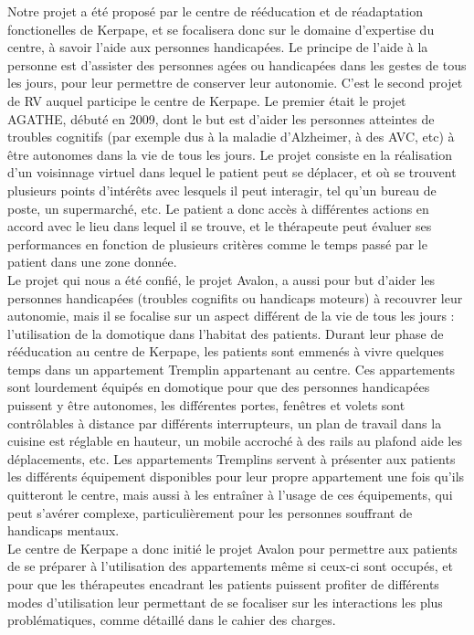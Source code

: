 Notre projet a été proposé par le centre de rééducation et de réadaptation fonctionelles de Kerpape, et se focalisera donc sur le domaine d'expertise du centre, à savoir l'aide aux personnes handicapées. Le principe de l'aide à la personne est d'assister des personnes agées ou handicapées dans les gestes de tous les jours, pour leur permettre de conserver leur autonomie. 
C'est le second projet de RV auquel participe le centre de Kerpape. Le premier était le projet AGATHE, débuté en 2009, dont le but est d'aider les personnes atteintes de troubles cognitifs (par exemple dus à la maladie d'Alzheimer, à des AVC, etc) à être autonomes dans la vie de tous les jours. Le projet consiste en la réalisation d'un \og voisinnage virtuel \fg{} dans lequel le patient peut se déplacer, et où se trouvent plusieurs points d'intérêts avec lesquels il peut interagir, tel qu'un bureau de poste, un supermarché, etc. Le patient a donc accès à différentes actions en accord avec le lieu dans lequel il se trouve, et le thérapeute peut évaluer ses performances en fonction de plusieurs critères comme le temps passé par le patient dans une zone donnée. \\

Le projet qui nous a été confié, le projet Avalon, a aussi pour but d'aider les personnes handicapées (troubles cognifits ou handicaps moteurs) à recouvrer leur autonomie, mais il se focalise sur un aspect différent de la vie de tous les jours : l'utilisation de la domotique dans l'habitat des patients. Durant leur phase de rééducation au centre de Kerpape, les patients sont emmenés à vivre quelques temps dans un appartement Tremplin appartenant au centre. Ces appartements sont lourdement équipés en domotique pour que des personnes handicapées puissent y être autonomes, les différentes portes, fenêtres et volets sont contrôlables à distance par différents interrupteurs, un plan de travail dans la cuisine est réglable en hauteur, un mobile accroché à des rails au plafond aide les déplacements, etc. 
Les appartements Tremplins servent à présenter aux patients les différents équipement disponibles pour leur propre appartement une fois qu'ils quitteront le centre, mais aussi à les entraîner à l'usage de ces équipements, qui peut s'avérer complexe, particulièrement pour les personnes souffrant de handicaps mentaux. \\

Le centre de Kerpape a donc initié le projet Avalon pour permettre aux patients de se préparer à l'utilisation des appartements même si ceux-ci sont occupés, et pour que les thérapeutes encadrant les patients puissent profiter de différents modes d'utilisation leur permettant de se focaliser sur les interactions les plus problématiques, comme détaillé dans le cahier des charges. 